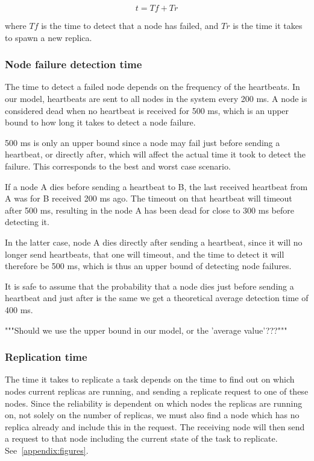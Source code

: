 \documentclass{cslthse-msc}
\begin{document}
\begin{equation} \label{eq:rep_time}
	t = Tf + Tr
\end{equation}

where $Tf$ is the time to detect that a node has failed, and $Tr$ is the time it takes to spawn a new replica.

\subsubsection{Node failure detection time} \label{sec:node_failure_detection_time}
The time to detect a failed node depends on the frequency of the heartbeats. In our model, heartbeats are sent to all nodes in the system every 200 ms. A node is considered dead when no heartbeat is received for 500 ms, which is an upper bound to how long it takes to detect a node failure.

500 ms is only an upper bound since a node may fail just before sending a heartbeat, or directly after, which will affect the actual time it took to detect the failure. This corresponds to the best and worst case scenario. 

If a node A dies before sending a heartbeat to B, the last received heartbeat from A was for B received 200 ms ago. The timeout on that heartbeat will timeout after 500 ms, resulting in the node A has been dead for close to 300 ms before detecting it. 

In the latter case, node A dies directly after sending a heartbeat, since it will no longer send heartbeats, that one will timeout, and the time to detect it will therefore be 500 ms, which is thus an upper bound of detecting node failures.

It is safe to assume that the probability that a node dies just before sending a heartbeat and just after is the same we get a theoretical average detection time of 400 ms.

"""Should we use the upper bound in our model, or the 'average value'???"""

\subsubsection{Replication time} \label{sec:replication_time}
The time it takes to replicate a task depends on the time to find out on which nodes current replicas are running, and sending a replicate request to one of these nodes. Since the reliability is dependent on which nodes the replicas are running on, not solely on the number of replicas, we must also find a node which has no replica already and include this in the request. The receiving node will then send a request to that node including the current state of the task to replicate. See~\cref{appendix:figures}.
\end{document}
